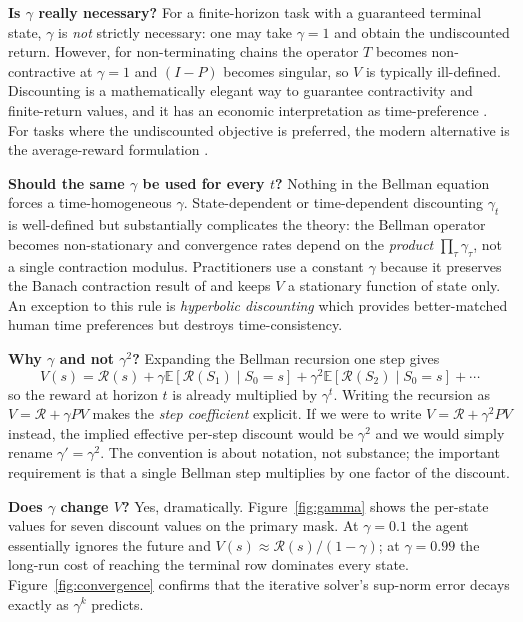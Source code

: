 \documentclass[11pt]{article}
\begin{document}
\textbf{Is $\gamma$ really necessary?} For a finite-horizon task with a
guaranteed terminal state, $\gamma$ is \emph{not} strictly necessary: one
may take $\gamma = 1$ and obtain the undiscounted return. However, for
non-terminating chains the operator $T$ becomes non-contractive at
$\gamma=1$ and $(I-P)$ becomes singular, so $V$ is typically
ill-defined. Discounting is a mathematically elegant way to guarantee
contractivity and finite-return values, and it has an economic
interpretation as time-preference \citep{samuelson1937}. For tasks
where the undiscounted objective is preferred, the modern alternative
is the average-reward formulation \citep{puterman1994}.

\textbf{Should the same $\gamma$ be used for every $t$?} Nothing in the
Bellman equation forces a time-homogeneous $\gamma$. State-dependent or
time-dependent discounting $\gamma_t$ is well-defined but substantially
complicates the theory: the Bellman operator becomes non-stationary and
convergence rates depend on the \emph{product} $\prod_{\tau}
\gamma_\tau$, not a single contraction modulus. Practitioners use a
constant $\gamma$ because it preserves the Banach contraction result of
\citet{banach1922} and keeps $V$ a stationary function of state only.
An exception to this rule is \emph{hyperbolic discounting} which
provides better-matched human time preferences but destroys
time-consistency.

\textbf{Why $\gamma$ and not $\gamma^{2}$?} Expanding the Bellman
recursion one step gives
\begin{equation*}
  V(s) = \mathcal{R}(s) + \gamma \mathbb{E}[\mathcal{R}(S_1) \mid S_0=s]
       + \gamma^2 \mathbb{E}[\mathcal{R}(S_2) \mid S_0=s] + \cdots
\end{equation*}
so the reward at horizon $t$ is already multiplied by $\gamma^t$.
Writing the recursion as $V = \mathcal{R} + \gamma P V$ makes the
\emph{step coefficient} explicit. If we were to write $V = \mathcal{R}
+ \gamma^2 P V$ instead, the implied effective per-step discount would
be $\gamma^2$ and we would simply rename $\gamma' = \gamma^2$. The
convention is about notation, not substance; the important
requirement is that a single Bellman step multiplies by one factor of
the discount.

\textbf{Does $\gamma$ change $V$?} Yes, dramatically.
Figure~\ref{fig:gamma} shows the per-state values for seven discount
values on the primary mask. At $\gamma = 0.1$ the agent essentially
ignores the future and $V(s) \approx \mathcal{R}(s)/(1-\gamma)$; at
$\gamma = 0.99$ the long-run cost of reaching the terminal row
dominates every state. Figure~\ref{fig:convergence} confirms that the
iterative solver's sup-norm error decays exactly as $\gamma^k$ predicts.
\end{document}

